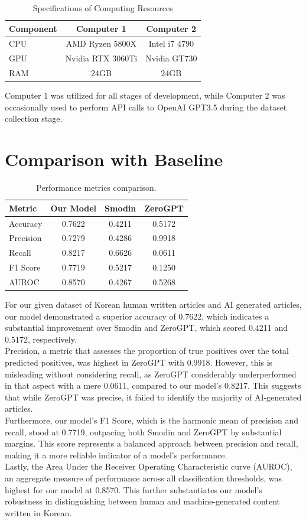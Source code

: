 \documentclass{article}
\begin{document}
\begin{table}[ht]
\centering
\begin{tabular}{l c c}
\hline
Component & Computer 1 & Computer 2 \\
\hline
CPU & AMD Ryzen 5800X & Intel i7 4790 \\
GPU & Nvidia RTX 3060Ti & Nvidia GT730 \\
RAM & 24GB & 24GB \\
\hline
\end{tabular}
\caption{Specifications of Computing Resources}
\label{tab:computing_resources}
\end{table}

Computer 1 was utilized for all stages of development, while Computer 2 was occasionally used to perform API calls to OpenAI GPT3.5 during the dataset collection stage.

\section{Comparison with Baseline}
\begin{table}[ht]
\centering
\begin{tabular}{l c c c}
\hline
Metric & Our Model & Smodin & ZeroGPT \\
\hline
Accuracy & 0.7622 & 0.4211 & 0.5172 \\
Precision & 0.7279 & 0.4286 & 0.9918 \\
Recall & 0.8217 & 0.6626 & 0.0611 \\
F1 Score & 0.7719 & 0.5217 & 0.1250 \\
AUROC & 0.8570 & 0.4267 & 0.5268 \\
\hline
\end{tabular}
\caption{Performance metrics comparison.}
\label{tab:performance_comparison}
\end{table}
\null\quad For our given dataset of Korean human written articles and AI generated articles, our model demonstrated a superior accuracy of 0.7622,
which indicates a substantial improvement over Smodin and ZeroGPT, which scored 0.4211 and 0.5172, respectively.\\
\null\quad Precision, a metric that assesses the proportion of true positives over the total predicted positives, was highest in ZeroGPT with 0.9918. 
However, this is misleading without considering recall, as ZeroGPT considerably underperformed in that aspect with a mere 0.0611, compared to our model's 0.8217. 
This suggests that while ZeroGPT was precise, it failed to identify the majority of AI-generated articles. \\
\null\quad Furthermore, our model's F1 Score, which is the harmonic mean of precision and recall, stood at 0.7719, outpacing both Smodin and ZeroGPT by substantial margins.
This score represents a balanced approach between precision and recall, making it a more reliable indicator of a model's performance. \\
\null\quad Lastly, the Area Under the Receiver Operating Characteristic curve (AUROC), an aggregate measure of performance across all classification thresholds, was highest for our model at 0.8570.
This further substantiates our model's robustness in distinguishing between human and machine-generated content written in Korean.
\end{document}
